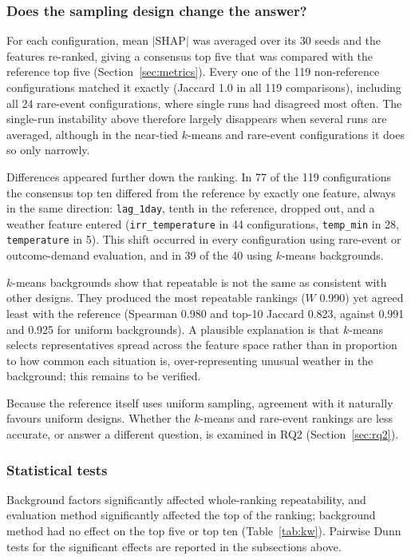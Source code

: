 \documentclass[11pt,a4paper]{article}
\newcommand{\feat}[1]{\texttt{#1}}
\begin{document}
\subsubsection{Does the sampling design change the answer?}

For each configuration, mean $|\text{SHAP}|$ was averaged over its 30 seeds and the features re-ranked, giving a consensus top five that was compared with the reference top five (Section~\ref{sec:metrics}). Every one of the 119 non-reference configurations matched it exactly (Jaccard 1.0 in all 119 comparisons), including all 24 rare-event configurations, where single runs had disagreed most often. The single-run instability above therefore largely disappears when several runs are averaged, although in the near-tied $k$-means and rare-event configurations it does so only narrowly.

Differences appeared further down the ranking. In 77 of the 119 configurations the consensus top ten differed from the reference by exactly one feature, always in the same direction: \feat{lag\_1day}, tenth in the reference, dropped out, and a weather feature entered (\feat{irr\_temperature} in 44 configurations, \feat{temp\_min} in 28, \feat{temperature} in 5). This shift occurred in every configuration using rare-event or outcome-demand evaluation, and in 39 of the 40 using $k$-means backgrounds.

$k$-means backgrounds show that repeatable is not the same as consistent with other designs. They produced the most repeatable rankings ($W$ 0.990) yet agreed least with the reference (Spearman 0.980 and top-10 Jaccard 0.823, against 0.991 and 0.925 for uniform backgrounds). A plausible explanation is that $k$-means selects representatives spread across the feature space rather than in proportion to how common each situation is, over-representing unusual weather in the background; this remains to be verified.

Because the reference itself uses uniform sampling, agreement with it naturally favours uniform designs. Whether the $k$-means and rare-event rankings are less accurate, or answer a different question, is examined in RQ2 (Section~\ref{sec:rq2}).

\subsubsection{Statistical tests}

Background factors significantly affected whole-ranking repeatability, and evaluation method significantly affected the top of the ranking; background method had no effect on the top five or top ten (Table~\ref{tab:kw}). Pairwise Dunn tests for the significant effects are reported in the subsections above.
\end{document}
